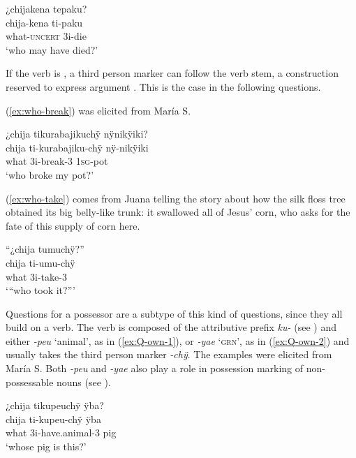 \ea\label{ex:who-die}
\begingl
\glpreamble ¿chijakena tepaku?\\
\gla chija-kena ti-paku\\
\glb what-\textsc{uncert} 3i-die\\
\glft ‘who may have died?’
\endgl
\trailingcitation{[jxx-p120430l-2.285]}
\xe


If the verb is , a third person marker can follow the verb stem, a construction reserved to express argument . This is the case in the following questions.

(\ref{ex:who-break}) was elicited from María S.

\ea\label{ex:who-break}
\begingl
\glpreamble ¿chija tikurabajikuchÿ nÿnikÿiki?\\
\gla chija ti-kurabajiku-chÿ nÿ-nikÿiki\\
\glb what 3i-break-3 1\textsc{sg}-pot\\
\glft ‘who broke my pot?’
\endgl
\trailingcitation{[rxx-e181024l]}
\xe

(\ref{ex:who-take}) comes from Juana telling the story about how the silk floss tree obtained its big belly-like trunk: it swallowed all of Jesus’ corn, who asks for the fate of this supply of corn here.

\ea\label{ex:who-take}
\begingl
\glpreamble “¿chija tumuchÿ?”\\
\gla chija ti-umu-chÿ\\
\glb what 3i-take-3\\
\glft ‘“who took it?”’
\endgl
\trailingcitation{[jxx-n101013s-1.663]}
\xe

Questions for a possessor  are a subtype of this kind of questions, since they all build on a verb. The verb is composed of the attributive prefix \textit{ku-} (see ) and either \textit{-peu} ‘animal’, as in (\ref{ex:Q-own-1}), or \textit{-yae} ‘\textsc{grn}’, as in (\ref{ex:Q-own-2}) and usually takes the third person marker \textit{-chÿ}. The examples were elicited from María S. Both \textit{-peu} and \textit{-yae} also play a role in possession marking of non-possessable nouns (see ).

\ea\label{ex:Q-own-1}
\begingl
\glpreamble ¿chija tikupeuchÿ ÿba?\\
\gla chija ti-kupeu-chÿ ÿba\\
\glb what 3i-have.animal-3 pig\\
\glft ‘whose pig is this?’
\endgl
\trailingcitation{[rxx-e201231f.08]}
\xe

